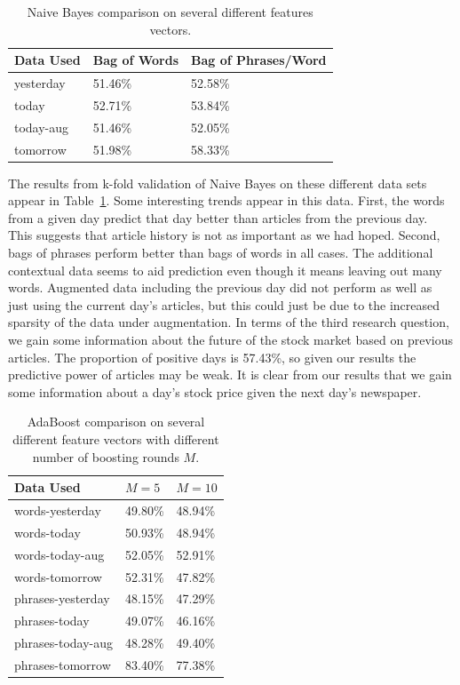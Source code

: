 \documentclass[10pt, twocolumn]{article}
\begin{document}
\begin{table}[h]
\centering
\begin{tabular}{|l|l|l|} \hline
Data Used & Bag of Words & Bag of Phrases/Word \\ \hline
yesterday & 51.46\% & 52.58\% \\
today & 52.71\% & 53.84\% \\
today-aug & 51.46\% & 52.05\% \\
tomorrow & 51.98\% & 58.33\% \\ \hline
\end{tabular}
\caption{Naive Bayes comparison on several different features vectors.}
\label{tab:nbcompare}
\end{table}

The results from k-fold validation of Naive Bayes on these different data sets appear in Table~\ref{tab:nbcompare}. Some interesting trends appear in this data. First, the words from a given day predict that day better than articles from the previous day. This suggests that article history is not as important as we had hoped. Second, bags of phrases perform better than bags of words in all cases. The additional contextual data seems to aid prediction even though it means leaving out many words. Augmented data including the previous day did not perform as well as just using the current day's articles, but this could just be due to the increased sparsity of the data under augmentation. In terms of the third research question, we gain some information about the future of the stock market based on previous articles. The proportion of positive days is 57.43\%, so given our results the predictive power of articles may be weak. It is clear from our results that we gain some information about a day's stock price given the next day's newspaper.

\begin{table}[h]
\centering
\begin{tabular}{|l|l|l|}
\hline
Data Used & $M = 5$ & $M = 10$ \\ \hline
words-yesterday & 49.80\% & 48.94\% \\
words-today     & 50.93\% & 48.94\% \\
words-today-aug & 52.05\% & 52.91\% \\
words-tomorrow  & 52.31\% & 47.82\% \\ \hline
phrases-yesterday & 48.15\% & 47.29\% \\ 
phrases-today    & 49.07\% & 46.16\% \\
phrases-today-aug & 48.28\% & 49.40\% \\
phrases-tomorrow  & 83.40\% & 77.38\% \\ \hline
\end{tabular}
\caption{AdaBoost comparison on several different feature vectors with different number of boosting rounds $M$.}
\label{tab:adacompare}
\end{table}
\end{document}
